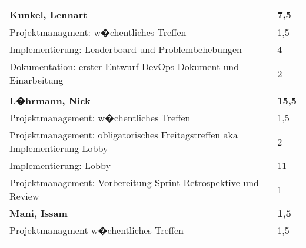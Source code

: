 \documentclass[a4paper,11pt]{scrartcl}
\begin{document}
\begin{longtable}{| p{13.8cm} | C{2.4cm} |}

	\textbf{Kunkel, Lennart} & \textbf{7,5}\\ %
	\hline

  Projektmanagment: w�chentliches Treffen
	&
  1,5
	\\
	\hline

  Implementierung: Leaderboard und Problembehebungen
	&
  4
	\\
	\hline

  Dokumentation: erster Entwurf DevOps Dokument und Einarbeitung
	&
  2
	\\
	\hline


	&

	\\
	\hline
	\hline


	\textbf{L�hrmann, Nick} & \textbf{15,5}\\ %
	\hline

	Projektmanagement: w�chentliches Treffen
	&
	1,5
	\\
	\hline

	Projektmanagement: obligatorisches Freitagstreffen aka Implementierung Lobby
	&
  2
	\\
	\hline

  Implementierung: Lobby
	&
  11
	\\
	\hline

  Projektmanagement: Vorbereitung Sprint Retrospektive und Review
	&
  1
	\\
	\hline
	\hline


	\textbf{Mani, Issam} & \textbf{1,5}\\ %
	\hline

  Projektmanagment w�chentliches Treffen
	&
  1,5
	\\
	\hline


	&

	\\
	\hline


\end{longtable}
\end{document}
